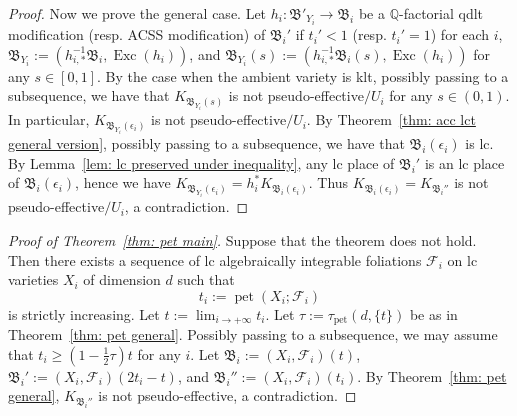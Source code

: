 \documentclass[11pt,reqno]{amsart}
\numberwithin{equation}{section}
\newcommand{\Exc}{\operatorname{Exc}}
\newcommand{\pet}{\operatorname{pet}}
\newcommand{\Bb}{{\mathfrak{B}}}
\newcommand{\Ff}{\mathcal{F}}
\theoremstyle{definition}
\begin{document}
\begin{proof}
    Now we prove the general case. Let $h_i: \Bb'_{Y_i}\rightarrow\Bb_i$ be a $\mathbb Q$-factorial qdlt modification (resp. ACSS modification) of $\Bb_i'$ if $t_i'<1$ (resp. $t_i'=1$) for each $i$, $\Bb_{Y_i}:=(h_{i,*}^{-1}\Bb_i,\Exc(h_i))$, and $\Bb_{Y_i}(s):=(h_{i,*}^{-1}\Bb_i(s),\Exc(h_i))$ for any $s\in [0,1]$. By the case when the ambient variety is klt, possibly passing to a subsequence, we have that $K_{\Bb_{Y_i}(s)}$ is not pseudo-effective$/U_i$ for any $s\in (0,1)$. In particular, $K_{\Bb_{Y_i}(\epsilon_i)}$ is not pseudo-effective$/U_i$. By Theorem~\ref{thm: acc lct general version}, possibly passing to a subsequence, we have that $\Bb_i(\epsilon_i)$ is lc. By Lemma~\ref{lem: lc preserved under inequality}, any lc place of $\Bb_i'$ is an lc place of $\Bb_i(\epsilon_i)$, hence we have $K_{\Bb_{Y_i}(\epsilon_i)}=h_i^*K_{\Bb_i(\epsilon_i)}$. Thus $K_{\Bb_i(\epsilon_i)}=K_{\Bb_i''}$ is not pseudo-effective$/U_i$, a contradiction.   
\end{proof}

\begin{proof}[Proof of Theorem~\ref{thm: pet main}]
Suppose that the theorem does not hold. Then there exists a sequence of lc algebraically integrable foliations $\Ff_i$ on lc varieties $X_i$ of dimension $d$ such that
$$t_i:=\pet(X_i;\Ff_i)$$
is strictly increasing. Let $t:=\lim_{i\rightarrow+\infty}t_i$. Let $\tau:=\tau_{\pet}(d,\{t\})$ be as in Theorem~\ref{thm: pet general}. Possibly passing to a subsequence, we may assume that $t_i\geq\left(1-\frac{1}{2}\tau\right)t$ for any $i$. Let $\Bb_i:=(X_i,\Ff_i)(t)$, $\Bb_i':=(X_i,\Ff_i)(2t_i-t)$, and $\Bb_i'':=(X_i,\Ff_i)(t_i)$. By Theorem~\ref{thm: pet general}, $K_{\Bb_i''}$ is not pseudo-effective, a contradiction.
\end{proof}
\end{document}
